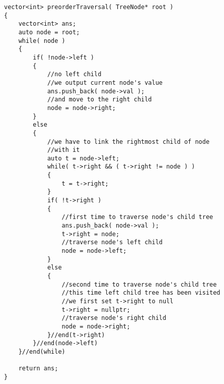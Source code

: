 \begin{lstlisting}[style=customc, caption={Morris Traversal}]
vector<int> preorderTraversal( TreeNode* root )
{
    vector<int> ans;
    auto node = root;
    while( node )
    {
        if( !node->left )
        {
            //no left child
            //we output current node's value
            ans.push_back( node->val );
            //and move to the right child
            node = node->right;
        }
        else
        {
            //we have to link the rightmost child of node
            //with it
            auto t = node->left;
            while( t->right && ( t->right != node ) )
            {
                t = t->right;
            }
            if( !t->right )
            {
                //first time to traverse node's child tree
                ans.push_back( node->val );
                t->right = node;
                //traverse node's left child
                node = node->left;
            }
            else
            {
                //second time to traverse node's child tree
                //this time left child tree has been visited
                //we first set t->right to null
                t->right = nullptr;
                //traverse node's right child
                node = node->right;
            }//end(t->right)
        }//end(node->left)
    }//end(while)

    return ans;
}
\end{lstlisting}